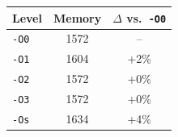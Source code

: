 \begin{tabular*}{\columnwidth}{@{\extracolsep\fill}lcc@{\extracolsep\fill}}
\toprule
\textbf{Level} & \textbf{Memory} & \textbf{$\Delta$ vs.\ \texttt{-O0}} \\
\midrule
\texttt{-O0} & 1572 & -- \\
\texttt{-O1} & 1604 & +2\% \\
\texttt{-O2} & 1572 & +0\% \\
\texttt{-O3} & 1572 & +0\% \\
\texttt{-Os} & 1634 & +4\% \\
\bottomrule
\end{tabular*}
